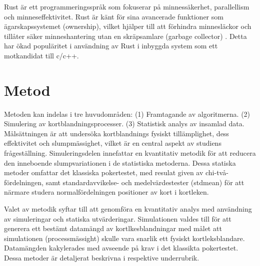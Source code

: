 \documentclass[swedish,a4paper]{article}
\begin{document}
Rust är ett programmeringsspråk som fokuserar på
minnessäkerhet, parallellism och minneseffektivitet. Rust är känt för
sina avancerade funktioner som ägarskapssystemet (ownership), vilket
hjälper till att förhindra minnesläckor och tillåter säker
minneshantering utan en skräpsamlare (garbage collector)
\parencite{rust}. Detta har ökad populäritet i användning av Rust i
inbyggda system som ett motkandidat till c/c++. 

\section{Metod} 
Metoden kan indelas i tre huvudområden:
(1) Framtagande av algoritmerna. 
(2) Simulering av kortblandningsprocesser. 
(3) Statistisk analys av insamlad data.
Målsättningen är att undersöka kortblandnings fysiskt tillämplighet, dess
effektivitet och slumpmässighet, vilket är en central aspekt av studiens
frågeställning. Simuleringsdelen innefattar en kvantitativ metodik för att
reducera den inneboende slumpvariationen i de statistiska metoderna.
Dessa statiska metoder omfattar det klassiska pokertestet,
med resulat given av chi-två-fördelningen, samt standardavvikelse- och
medelvärdestester (\gls{stdmean})  för att närmare
studera normalfördelningen positioner av kort i kortleken.

Valet av metodik syftar till att genomföra en kvantitativ analys med användning av 
simuleringar och statiska utvärderingar. Simulationen valdes till för
att generera ett bestämt datamängd av kortlkesblandningar med målet att
simulationen (processmässight) skulle vara snarlik ett fysiskt
kortleks\-blandare. Datamängden kakylerades med avseende på krav i det klassikta
pokertestet. Dessa metoder är detaljerat beskrivna i respektive underrubrik.
%
%
\end{document}
